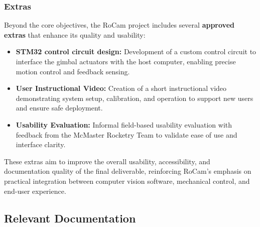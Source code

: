 \documentclass[12pt, titlepage]{article}
\begin{document}
\subsubsection*{Extras}
Beyond the core objectives, the RoCam project includes several 
\textbf{approved extras} that enhance its quality and usability:
\begin{itemize}
    \item \textbf{STM32 control circuit design:} Development of a 
    custom control circuit to interface the gimbal actuators with 
    the host computer, enabling precise motion control and feedback sensing.
    \item \textbf{User Instructional Video:} Creation of a short instructional 
    video demonstrating system setup, calibration, and operation to support 
    new users and ensure safe deployment.
    \item \textbf{Usability Evaluation:} Informal field-based usability 
    evaluation with feedback from the McMaster Rocketry Team to validate 
    ease of use and interface clarity.
\end{itemize}

These extras aim to improve the overall usability, accessibility, 
and documentation quality of the final deliverable, reinforcing RoCam's 
emphasis on practical integration between computer vision 
 software, mechanical control, and end-user experience.



\subsection{Relevant Documentation}
\end{document}
